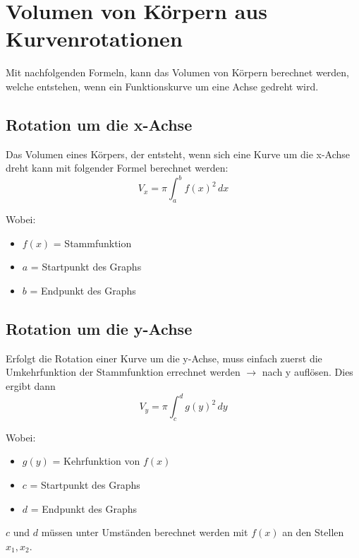 \documentclass[12pt]{scrartcl}
\begin{document}
\section{Volumen von Körpern aus Kurvenrotationen}
Mit nachfolgenden Formeln, kann das Volumen von Körpern berechnet werden, welche entstehen, wenn ein
Funktionskurve um eine Achse gedreht wird.
 

\subsection{Rotation um die x-Achse}
Das Volumen eines Körpers, der entsteht, wenn sich eine Kurve um die x-Achse dreht 
kann mit folgender Formel berechnet werden:
\[V_x = \pi \int_{a}^{b}{f(x)^2} \, dx\]

Wobei:
\begin{itemize}
    \item $f(x)$ = Stammfunktion
    \item $a$ = Startpunkt des Graphs
    \item $b$ = Endpunkt des Graphs
\end{itemize}

\subsection{Rotation um die y-Achse}
Erfolgt die Rotation einer Kurve um die y-Achse, muss einfach zuerst die Umkehrfunktion 
der Stammfunktion errechnet werden $\rightarrow$ nach y auflösen. Dies ergibt dann
\[ V_y = \pi \int_{c}^{d}{g(y)^2} \, dy \]

Wobei:
\begin{itemize}
    \item $g(y)$ = Kehrfunktion von $f(x)$
    \item $c$ = Startpunkt des Graphs
    \item $d$ = Endpunkt des Graphs 
\end{itemize}

$c$ und $d$ müssen unter Umständen berechnet werden mit $f(x)$ an den Stellen $x_1, x_2$.



% 
\end{document}
